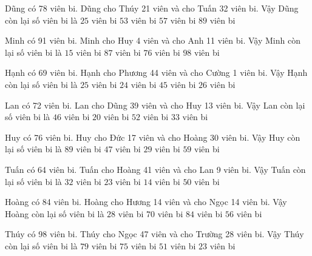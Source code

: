 \documentclass[12pt,a4paper]{article}
\begin{document}
\begin{ex}
Dũng có 78 viên bi. Dũng cho Thúy 21 viên và cho Tuấn 32 viên bi. Vậy Dũng còn lại số viên bi là
 \choice 
{\True $25$ viên bi}
{$53$ viên bi}
{$57$ viên bi}
{$89$ viên bi}
\end{ex}
\begin{ex}
Minh có 91 viên bi. Minh cho Huy 4 viên và cho Anh 11 viên bi. Vậy Minh còn lại số viên bi là
 \choice 
{$15$ viên bi}
{$87$ viên bi}
{\True $76$ viên bi}
{$98$ viên bi}
\end{ex}
\begin{ex}
Hạnh có 69 viên bi. Hạnh cho Phương 44 viên và cho Cường 1 viên bi. Vậy Hạnh còn lại số viên bi là
 \choice 
{$25$ viên bi}
{\True $24$ viên bi}
{$45$ viên bi}
{$26$ viên bi}
\end{ex}
\begin{ex}
Lan có 72 viên bi. Lan cho Dũng 39 viên và cho Huy 13 viên bi. Vậy Lan còn lại số viên bi là
 \choice 
{$46$ viên bi}
{\True $20$ viên bi}
{$52$ viên bi}
{$33$ viên bi}
\end{ex}
\begin{ex}
Huy có 76 viên bi. Huy cho Đức 17 viên và cho Hoàng 30 viên bi. Vậy Huy còn lại số viên bi là
 \choice 
{$89$ viên bi}
{$47$ viên bi}
{\True $29$ viên bi}
{$59$ viên bi}
\end{ex}
\begin{ex}
Tuấn có 64 viên bi. Tuấn cho Hoàng 41 viên và cho Lan 9 viên bi. Vậy Tuấn còn lại số viên bi là
 \choice 
{$32$ viên bi}
{$23$ viên bi}
{\True $14$ viên bi}
{$50$ viên bi}
\end{ex}
\begin{ex}
Hoàng có 84 viên bi. Hoàng cho Hương 14 viên và cho Ngọc 14 viên bi. Vậy Hoàng còn lại số viên bi là
 \choice 
{$28$ viên bi}
{$70$ viên bi}
{$84$ viên bi}
{\True $56$ viên bi}
\end{ex}
\begin{ex}
Thúy có 98 viên bi. Thúy cho Ngọc 47 viên và cho Trường 28 viên bi. Vậy Thúy còn lại số viên bi là
 \choice 
{$79$ viên bi}
{$75$ viên bi}
{$51$ viên bi}
{\True $23$ viên bi}
\end{ex}
\end{document}
